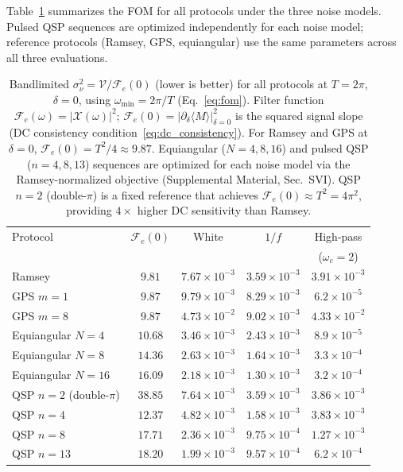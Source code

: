 \documentclass[aps,pra,twocolumn,superscriptaddress,longbibliography]{revtex4-2}
\begin{document}
Table~\ref{tab:fom} summarizes the FOM for all protocols under the three
noise models.
Pulsed QSP sequences are optimized independently for each noise model;
reference protocols (Ramsey, GPS, equiangular) use the same parameters across
all three evaluations.

\begin{table}[t]
\centering
\begin{tabular}{lcccc}
\toprule
Protocol & $\mathcal{F}_e(0)$ & White & $1/f$ & High-pass \\
         &                    &       &       & ($\omega_c=2$) \\
\midrule
Ramsey               & $9.81$  & $7.67\times10^{-3}$ & $3.59\times10^{-3}$ & $3.91\times10^{-3}$ \\
GPS $m{=}1$          & $9.87$  & $9.79\times10^{-3}$ & $8.29\times10^{-3}$ & $6.2\times10^{-5}$  \\
GPS $m{=}8$          & $9.87$  & $4.73\times10^{-2}$ & $9.02\times10^{-3}$ & $4.33\times10^{-2}$ \\
Equiangular $N{=}4$  & $10.68$ & $3.46\times10^{-3}$ & $2.43\times10^{-3}$ & $8.9\times10^{-5}$  \\
Equiangular $N{=}8$  & $14.36$ & $2.63\times10^{-3}$ & $1.64\times10^{-3}$ & $3.3\times10^{-4}$  \\
Equiangular $N{=}16$ & $16.09$ & $2.18\times10^{-3}$ & $1.30\times10^{-3}$ & $3.2\times10^{-4}$  \\
\midrule
QSP $n{=}2$ (double-$\pi$) & $38.85$ & $7.64\times10^{-3}$ & $3.59\times10^{-3}$ & $3.86\times10^{-3}$ \\
QSP $n{=}4$  & $12.37$ & $4.82\times10^{-3}$ & $1.58\times10^{-3}$ & $3.83\times10^{-3}$ \\
QSP $n{=}8$  & $17.71$ & $2.36\times10^{-3}$ & $9.75\times10^{-4}$ & $1.27\times10^{-3}$ \\
QSP $n{=}13$ & $18.20$ & $1.99\times10^{-3}$ & $9.57\times10^{-4}$ & $6.2\times10^{-4}$  \\
\bottomrule
\end{tabular}
\caption{%
  Bandlimited $\sigma^2_\nu = \mathcal{V}/\mathcal{F}_e(0)$ (lower is better)
  for all protocols at $T=2\pi$, $\delta=0$,
  using $\omega_{\min}=2\pi/T$ (Eq.~\eqref{eq:fom}).
  Filter function $\mathcal{F}_e(\omega) = |\mathcal{X}(\omega)|^2$;
  $\mathcal{F}_e(0) = |\partial_\delta\langle M\rangle|^2_{\delta=0}$
  is the squared signal slope (DC consistency condition~\eqref{eq:dc_consistency}).
  For Ramsey and GPS at $\delta{=}0$, $\mathcal{F}_e(0)=T^2/4\approx9.87$.
  Equiangular ($N{=}4,8,16$) and pulsed QSP ($n{=}4,8,13$) sequences are optimized
  for each noise model via the Ramsey-normalized objective (Supplemental Material,
  Sec.~SVI).
  QSP $n{=}2$ (double-$\pi$) is a fixed reference that achieves
  $\mathcal{F}_e(0)\approx T^2=4\pi^2$, providing $4\times$ higher DC sensitivity
  than Ramsey.%
}
\label{tab:fom}
\end{table}
\end{document}
